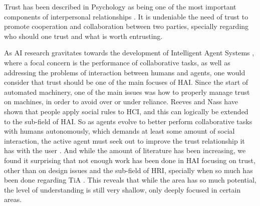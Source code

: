 \label{chap:intro}

Trust has been described in Psychology as being one of the most important components of interpersonal relationships \cite{Simpson2007}. It is undeniable the need of trust to promote cooperation and collaboration between two parties, specially regarding who should one trust and what is worth entrusting.


As \ac{AI} research gravitates towards the development of Intelligent Agent Systems \cite{Russell2009a}, where a focal concern is the performance of collaborative tasks\cite{Grosz1996, Allen2002, Allen2007}, as well as addressing the problems of interaction between humans and agents\cite{Bradshaw2011}, one would consider that trust should be one of the main focuses of \ac{HAI}. Since the start of automated machinery, one of the main issues was how to properly manage trust on machines, in order to avoid over or under reliance\cite{Lee2004}. Reeves and Nass have shown that people apply social rules to \ac{HCI}, and this can logically be extended to the sub-field of \ac{HAI}\cite{Reeves1998a}. So as agents evolve to better perform collaborative tasks with humans autonomously, which demands at least some amount of social interaction, the active agent must seek out to improve the trust relationship it has with the user \cite{Lashkari1994}. And while the amount of literature has been increasing, we found it surprising that not enough work has been done in \ac{HAI} focusing on trust, other than on design issues\cite{Bickmore2005} and the sub-field of \ac{HRI}\cite{Goodrich2007, VandenBrule2014}, specially when so much has been done regarding \ac{TiA} \cite{Lee1992, Jones1997, Lee2004}. This reveals that while the area has so much potential, the level of understanding is still very shallow, only deeply focused in certain areas\cite{Granatyr2015}.

